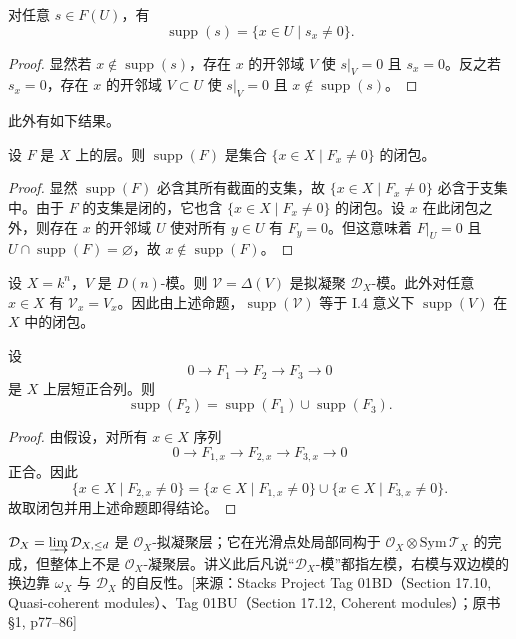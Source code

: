 \begin{lemma}
对任意 $s\in F(U)$，有
$$\operatorname{supp}(s)=\{x\in U\mid s_x\neq 0\}.$$
\end{lemma}

\begin{proof}
显然若 $x\notin\operatorname{supp}(s)$，存在 $x$ 的开邻域 $V$ 使 $s|_V=0$ 且 $s_x=0$。反之若 $s_x=0$，存在 $x$ 的开邻域 $V\subset U$ 使 $s|_V=0$ 且 $x\notin\operatorname{supp}(s)$。
\end{proof}

此外有如下结果。

\begin{proposition}
设 $F$ 是 $X$ 上的层。则 $\operatorname{supp}(F)$ 是集合 $\{x\in X\mid F_x\neq 0\}$ 的闭包。
\end{proposition}

\begin{proof}
显然 $\operatorname{supp}(F)$ 必含其所有截面的支集，故 $\{x\in X\mid F_x\neq 0\}$ 必含于支集中。由于 $F$ 的支集是闭的，它也含 $\{x\in X\mid F_x\neq 0\}$ 的闭包。设 $x$ 在此闭包之外，则存在 $x$ 的开邻域 $U$ 使对所有 $y\in U$ 有 $F_y=0$。但这意味着 $F|_U=0$ 且 $U\cap\operatorname{supp}(F)=\varnothing$，故 $x\notin\operatorname{supp}(F)$。
\end{proof}

设 $X=k^n$，$V$ 是 $D(n)$-模。则 $\mathcal{V}=\Delta(V)$ 是拟凝聚 $\mathcal{D}_X$-模。此外对任意 $x\in X$ 有 $\mathcal{V}_x=V_x$。因此由上述命题，$\operatorname{supp}(\mathcal{V})$ 等于 I.4 意义下 $\operatorname{supp}(V)$ 在 $X$ 中的闭包。

\begin{proposition}
设
$$0\longrightarrow F_1\longrightarrow F_2\longrightarrow F_3\longrightarrow 0$$
是 $X$ 上层短正合列。则
$$\operatorname{supp}(F_2)=\operatorname{supp}(F_1)\cup\operatorname{supp}(F_3).$$
\end{proposition}

\begin{proof}
由假设，对所有 $x\in X$ 序列
$$0\longrightarrow F_{1,x}\longrightarrow F_{2,x}\longrightarrow F_{3,x}\longrightarrow 0$$
正合。因此
$$\{x\in X\mid F_{2,x}\neq 0\}=\{x\in X\mid F_{1,x}\neq 0\}\cup\{x\in X\mid F_{3,x}\neq 0\}.$$
故取闭包并用上述命题即得结论。
\end{proof}
\begin{annote}
$\mathcal D_X=\varinjlim\mathcal D_{X,\le d}$ 是 $\mathcal O_X$-拟凝聚层；它在光滑点处局部同构于 $\mathcal O_X\otimes\mathrm{Sym}\,\mathcal T_X$ 的完成，但整体上不是 $\mathcal O_X$-凝聚层。讲义此后凡说“$\mathcal D_X$-模”都指左模，右模与双边模的换边靠 $\omega_X$ 与 $\mathcal D_X$ 的自反性。[来源：Stacks Project Tag 01BD（Section 17.10, Quasi-coherent modules）、Tag 01BU（Section 17.12, Coherent modules）；原书 §1, p77–86]
\end{annote}



